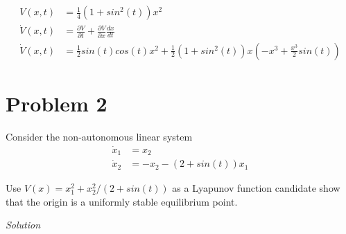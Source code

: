 \documentclass{article}
\begin{document}
  \begin{align*}
    V(x,t) &= \frac{1}{4}(1+sin^2(t))x^2 \\
    \dot{V}(x,t) &= \frac{\partial V}{\partial t} + \frac{\partial V}{\partial x}\frac{dx}{dt} \\
    \dot{V}(x,t) &= \frac{1}{2}sin(t)cos(t)x^2 + \frac{1}{2}(1+sin^2(t))x(-x^3 + \frac{x^3}{2}sin(t))
  \end{align*}
  

  \newpage

  \section{Problem 2}

  Consider the non-autonomous linear system
  \begin{align*}
    \dot{x}_1 &= x_2 \\
    \dot{x}_2 &= -x_2 - (2+sin(t))x_1
  \end{align*}

  Use $V(x)=x_1^2+x_2^2/(2+sin(t))$ as a Lyapunov function candidate show that
  the origin is a uniformly stable equilibrium point. \newline \newline
  
  \noindent \textit{Solution} \newline \newline


 
\end{document}
